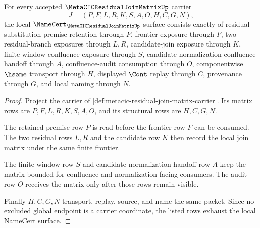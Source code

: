 \begin{theorem}
\label{thm:metacic-residual-join-matrix-namecert-obligations}
For every accepted $\MetaCICResidualJoinMatrixUp$ carrier
$$
J=(P,F,L,R,K,S,A,O,H,C,G,N),
$$
the local $\NameCert_{\MetaCICResidualJoinMatrixUp}$ surface consists exactly of residual-substitution premise retention through $P$, frontier exposure through $F$, two residual-branch exposures through $L,R$, candidate-join exposure through $K$, finite-window confluence exposure through $S$, candidate-normalization confluence handoff through $A$, confluence-audit consumption through $O$, componentwise $\hsame$ transport through $H$, displayed $\Cont$ replay through $C$, provenance through $G$, and local naming through $N$.
\end{theorem}
\begin{proof}
Project the carrier of \autoref{def:metacic-residual-join-matrix-carrier}. Its matrix rows are $P,F,L,R,K,S,A,O$, and its structural rows are $H,C,G,N$.

The retained premise row $P$ is read before the frontier row $F$ can be consumed. The two residual rows $L,R$ and the candidate row $K$ then record the local join matrix under the same finite frontier.

The finite-window row $S$ and candidate-normalization handoff row $A$ keep the matrix bounded for confluence and normalization-facing consumers. The audit row $O$ receives the matrix only after those rows remain visible.

Finally $H,C,G,N$ transport, replay, source, and name the same packet. Since no excluded global endpoint is a carrier coordinate, the listed rows exhaust the local NameCert surface.
\end{proof}

